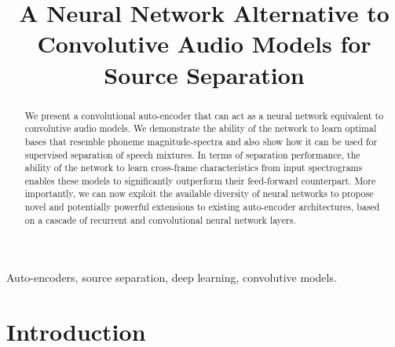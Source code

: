 \documentclass{article}
\title{A Neural Network Alternative to Convolutive Audio Models for Source Separation}
\begin{document}
%

\maketitle
%
\begin{abstract}
We present a convolutional auto-encoder that can act as a neural network equivalent to convolutive audio models. We demonstrate the ability of the network to learn optimal bases that resemble phoneme magnitude-spectra and also show how it can be used for supervised separation of speech mixtures. In terms of separation performance, the ability of the network to learn cross-frame characteristics from input spectrograms enables these models to significantly outperform their feed-forward counterpart. More importantly, we can now exploit the available diversity of neural networks to propose novel and potentially powerful extensions to existing auto-encoder architectures, based on a cascade of recurrent and convolutional neural network layers. \\

\end{abstract}
%
\begin{keywords}
Auto-encoders, source separation, deep learning, convolutive models.
\end{keywords}
%
\section{Introduction}
\label{sec:intro}

\end{document}

